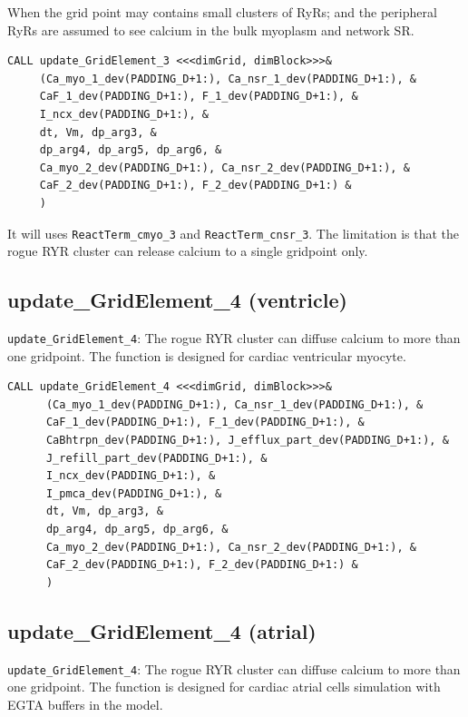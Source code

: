 When the grid point may contains small clusters of RyRs; and the peripheral
RyRs are assumed to see calcium in the bulk myoplasm and network SR.
\begin{verbatim}
CALL update_GridElement_3 <<<dimGrid, dimBlock>>>&
     (Ca_myo_1_dev(PADDING_D+1:), Ca_nsr_1_dev(PADDING_D+1:), &
     CaF_1_dev(PADDING_D+1:), F_1_dev(PADDING_D+1:), &
     I_ncx_dev(PADDING_D+1:), &
     dt, Vm, dp_arg3, &
     dp_arg4, dp_arg5, dp_arg6, &
     Ca_myo_2_dev(PADDING_D+1:), Ca_nsr_2_dev(PADDING_D+1:), &
     CaF_2_dev(PADDING_D+1:), F_2_dev(PADDING_D+1:) &
     )
\end{verbatim}

It will uses \verb!ReactTerm_cmyo_3! and \verb!ReactTerm_cnsr_3!.  The
limitation is that the rogue RYR cluster can release calcium to a single
gridpoint only.

\subsection{update\_GridElement\_4 (ventricle)}
\label{sec:update_gridelement_4_ventricle}

\verb!update_GridElement_4!: The rogue RYR cluster can diffuse calcium to more
than one gridpoint. The function is designed for cardiac ventricular myocyte.

{\small \begin{verbatim}
CALL update_GridElement_4 <<<dimGrid, dimBlock>>>&
      (Ca_myo_1_dev(PADDING_D+1:), Ca_nsr_1_dev(PADDING_D+1:), &
      CaF_1_dev(PADDING_D+1:), F_1_dev(PADDING_D+1:), &
      CaBhtrpn_dev(PADDING_D+1:), J_efflux_part_dev(PADDING_D+1:), &
      J_refill_part_dev(PADDING_D+1:), & 
      I_ncx_dev(PADDING_D+1:), &
      I_pmca_dev(PADDING_D+1:), &        
      dt, Vm, dp_arg3, &        
      dp_arg4, dp_arg5, dp_arg6, &       
      Ca_myo_2_dev(PADDING_D+1:), Ca_nsr_2_dev(PADDING_D+1:), &     
      CaF_2_dev(PADDING_D+1:), F_2_dev(PADDING_D+1:) &     
      )   
\end{verbatim}}

\subsection{update\_GridElement\_4 (atrial)}
\label{sec:update_gridelement_4_atrial}

\verb!update_GridElement_4!: The rogue RYR cluster can diffuse calcium to more
than one gridpoint. The function is designed for cardiac atrial cells
simulation with EGTA buffers in the model.

